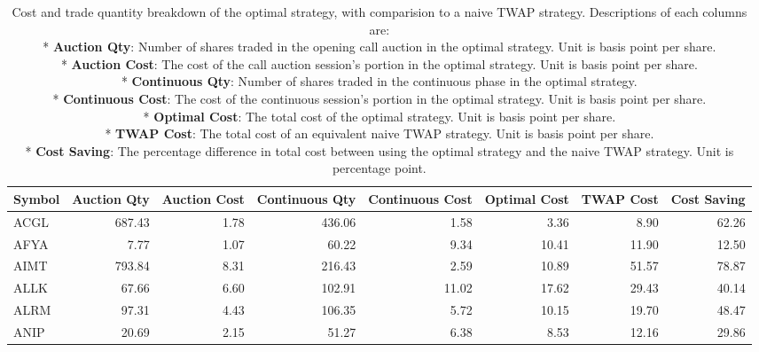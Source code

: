 \begin{table}
\centering
\caption{Cost and trade quantity breakdown of the optimal strategy, with comparision to a naive TWAP strategy. Descriptions of each columns are: \\
 * \textbf{Auction Qty}: Number of shares traded in the opening call auction in the optimal strategy. Unit is basis point per share. \\
 * \textbf{Auction Cost}: The cost of the call auction session's portion in the optimal strategy. Unit is basis point per share. \\
 * \textbf{Continuous Qty}:  Number of shares traded in the continuous phase in the optimal strategy. \\
 * \textbf{Continuous Cost}: The cost of the continuous session's portion in the optimal strategy. Unit is basis point per share. \\
 * \textbf{Optimal Cost}: The total cost of the optimal strategy. Unit is basis point per share. \\
 * \textbf{TWAP Cost}: The total cost of an equivalent naive TWAP strategy. Unit is basis point per share. \\
 * \textbf{Cost Saving}: The percentage difference in total cost between using the optimal strategy and the naive TWAP strategy. Unit is percentage point.\\
}
\label{table:StockCost}
\begin{tabular}{lrrrrrrr}
\toprule
Symbol &  Auction Qty &  Auction Cost &  Continuous Qty &  Continuous Cost &  Optimal Cost &  TWAP Cost &  Cost Saving \\
\midrule
  ACGL &       687.43 &          1.78 &          436.06 &             1.58 &          3.36 &       8.90 &        62.26 \\
  AFYA &         7.77 &          1.07 &           60.22 &             9.34 &         10.41 &      11.90 &        12.50 \\
  AIMT &       793.84 &          8.31 &          216.43 &             2.59 &         10.89 &      51.57 &        78.87 \\
  ALLK &        67.66 &          6.60 &          102.91 &            11.02 &         17.62 &      29.43 &        40.14 \\
  ALRM &        97.31 &          4.43 &          106.35 &             5.72 &         10.15 &      19.70 &        48.47 \\
  ANIP &        20.69 &          2.15 &           51.27 &             6.38 &          8.53 &      12.16 &        29.86 \\

\end{tabular}
\end{table}
